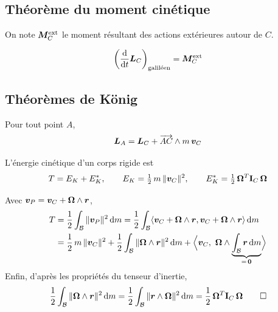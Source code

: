 \subsection{Théorème du moment cinétique}

On note $\bm{M}_C^{\mathrm{ext}}$ le moment résultant des actions
extérieures autour de $C$.

\begin{theoreme}
    \[
        \left(\frac{\mathrm{d}}{\mathrm{d} t}\bm{L}_C\right)_{\text{galiléen}}
        = \bm{M}_C^{\mathrm{ext}}
    \]
\end{theoreme}

\subsection{Théorèmes de König}

\begin{theoreme}
    Pour tout point $A$,
    \[
        \bm{L}_A = \bm{L}_C
        + \overrightarrow{AC}\wedge m\,\bm{v}_C
    \]
\end{theoreme}

\begin{theoreme}
    L'énergie cinétique d'un corps rigide est
    \[
        T = E_K + E_K^*,
        \qquad
        E_K = \tfrac12\,m\,\|\bm{v}_C\|^2,
        \qquad
        E_K^* = \tfrac12\,\bm{\Omega}^T\mathbf{I}_C\,\bm{\Omega}
    \]
\end{theoreme}

\begin{preuve}
    Avec $\bm{v}_P = \bm{v}_C + \bm{\Omega}\wedge\bm{r}$,
    \begin{align*}
        T &= \frac12\int_{\mathcal{B}}\|\bm{v}_P\|^2\,\mathrm{d} m
        = \frac12\int_{\mathcal{B}}
        \langle\bm{v}_C + \bm{\Omega}\wedge\bm{r},
        \bm{v}_C + \bm{\Omega}\wedge\bm{r}\rangle\,\mathrm{d} m\\
        &= \frac12\,m\,\|\bm{v}_C\|^2
        + \frac12\int_{\mathcal{B}}\|\bm{\Omega}\wedge\bm{r}\|^2
        \,\mathrm{d} m
        + \Bigl\langle\bm{v}_C,\ \bm{\Omega}\wedge
        \underbrace{\int_{\mathcal{B}}\bm{r}\,\mathrm{d} m}_{=\,\bm{0}}
        \Bigr\rangle
    \end{align*}
    Enfin, d'après les propriétés du tenseur d'inertie,
    \[
        \frac12\int_{\mathcal{B}}\|\bm{\Omega}\wedge\bm{r}\|^2\,\mathrm{d} m
        = \frac12\int_{\mathcal{B}}\|\bm{r}\wedge\bm{\Omega}\|^2\,\mathrm{d} m
        = \frac12\,\bm{\Omega}^T\mathbf{I}_C\,\bm{\Omega}
        \qedhere
    \]
\end{preuve}


